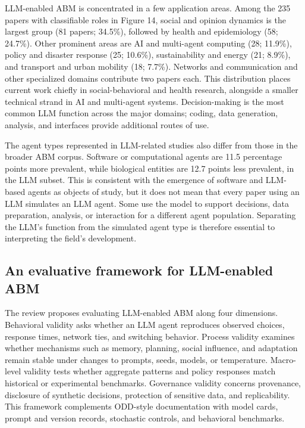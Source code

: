 LLM-enabled ABM is concentrated in a few application areas. Among the 235 papers with classifiable roles in Figure 14, social and opinion dynamics is the largest group (81 papers; 34.5\%), followed by health and epidemiology (58; 24.7\%). Other prominent areas are AI and multi-agent computing (28; 11.9\%), policy and disaster response (25; 10.6\%), sustainability and energy (21; 8.9\%), and transport and urban mobility (18; 7.7\%). Networks and communication and other specialized domains contribute two papers each. This distribution places current work chiefly in social-behavioral and health research, alongside a smaller technical strand in AI and multi-agent systems. Decision-making is the most common LLM function across the major domains; coding, data generation, analysis, and interfaces provide additional routes of use.

The agent types represented in LLM-related studies also differ from those in the broader ABM corpus. Software or computational agents are 11.5 percentage points more prevalent, while biological entities are 12.7 points less prevalent, in the LLM subset. This is consistent with the emergence of software and LLM-based agents as objects of study, but it does not mean that every paper using an LLM simulates an LLM agent. Some use the model to support decisions, data preparation, analysis, or interaction for a different agent population. Separating the LLM’s function from the simulated agent type is therefore essential to interpreting the field’s development.

\subsection{An evaluative framework for LLM-enabled ABM}

The review proposes evaluating LLM-enabled ABM along four dimensions. Behavioral validity asks whether an LLM agent reproduces observed choices, response times, network ties, and switching behavior. Process validity examines whether mechanisms such as memory, planning, social influence, and adaptation remain stable under changes to prompts, seeds, models, or temperature. Macro-level validity tests whether aggregate patterns and policy responses match historical or experimental benchmarks. Governance validity concerns provenance, disclosure of synthetic decisions, protection of sensitive data, and replicability. This framework complements ODD-style documentation with model cards, prompt and version records, stochastic controls, and behavioral benchmarks.